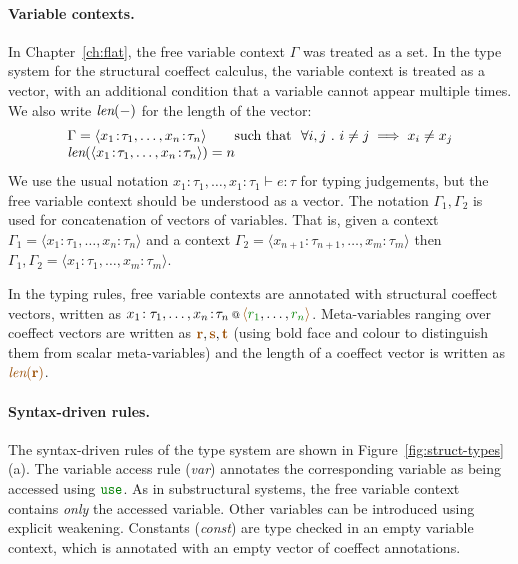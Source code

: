 
\paragraph{Variable contexts.}
In Chapter~\ref{ch:flat}, the free variable context $\Gamma$ was treated as a set. In the type
system for the structural coeffect calculus, the variable context is treated as a vector, with
an additional condition that a variable cannot appear multiple times. We also write ${\textit{len}(-)}$ for the
length of the vector:
%
\begin{equation*}
\begin{array}{l}
 \Gamma = \langle x_1\!:\!\tau_1, \ldots, x_n\!:\!\tau_n \rangle \qquad \textnormal{such that}~~\forall i, j ~.~ i \neq j \implies x_i \neq x_j\\
 \xlen{\langle x_1\!:\!\tau_1, \ldots, x_n\!:\!\tau_n \rangle} = n
\end{array}
\end{equation*}
%
We use the usual notation $x_1\!:\!\tau_1, \ldots, x_1\!:\!\tau_1 \vdash e : \tau$ for
typing judgements, but the free variable context should be understood as a vector.
The notation $\Gamma_1, \Gamma_2$ is used for concatenation of vectors of variables. That is,
given a context $\Gamma_1 = \langle x_1\!:\!\tau_1, \ldots, x_n\!:\!\tau_n \rangle $ and a context
$\Gamma_2 = \langle x_{n+1}\!:\!\tau_{n+1}, \ldots, x_m\!:\!\tau_m \rangle $ then
$\Gamma_1, \Gamma_2 = \langle x_1\!:\!\tau_1, \ldots, x_m\!:\!\tau_m \rangle$.

In the typing rules, free variable contexts are annotated with structural coeffect vectors,
written as $\coctx{x_1\!:\tau_1,\ldots,x_n\!:\!\tau_n}{\alift{\cclrd{r_1}, \ldots, \cclrd{r_n}}}$.
Meta-variables ranging over coeffect vectors are written as $\aclrd{\textbf{r}}, \aclrd{\textbf{s}}, \aclrd{\textbf{t}}$
(using bold face and colour to distinguish them from scalar meta-variables) and the length of a
coeffect vector is written as $\alen{\aclrd{\textbf{r}}}$.

\paragraph{Syntax-driven rules.}
The syntax-driven rules of the type system are shown in Figure~\ref{fig:struct-types} (a).
The variable access rule (\emph{var}) annotates the corresponding variable as being accessed
using $\cunit$. As in substructural systems, the free variable context contains
\emph{only} the accessed variable. Other variables can be introduced using explicit weakening.
Constants (\emph{const}) are type checked in an empty variable context, which is annotated with
an empty vector of coeffect annotations.

